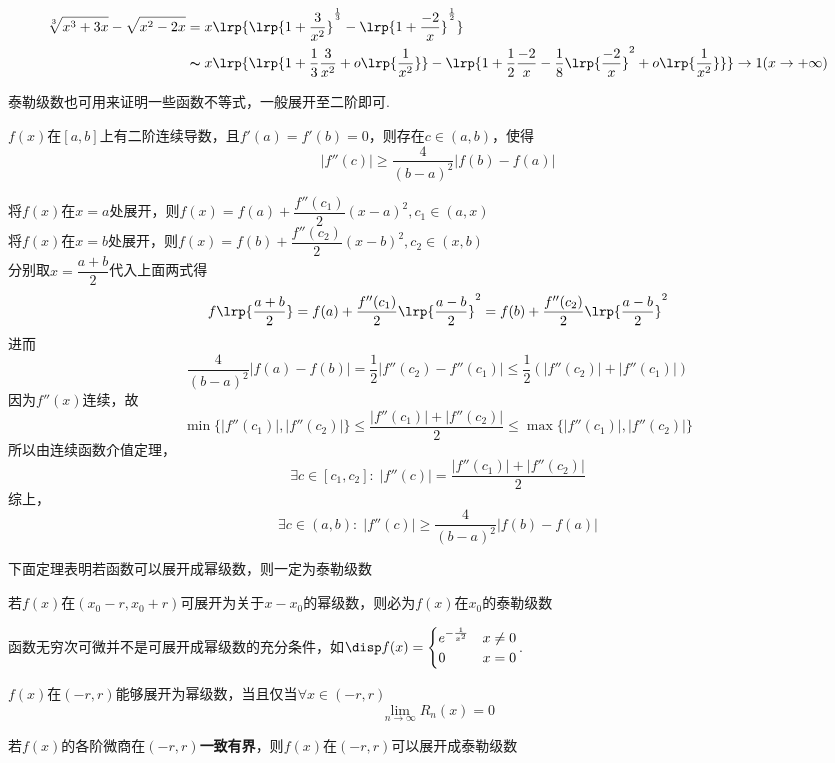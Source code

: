 \begin{analysis}
\[\begin{aligned}
\sqrt[3]{x^3+3x}-\sqrt{x^2-2x}&= x\lrp{\lrp{1+\dfrac{3}{x^2}}^\frac{1}{3}-\lrp{1+\dfrac{-2}{x}}^\frac{1}{2}}\\
&\thicksim x\lrp{\lrp{1+\dfrac{1}{3}\dfrac{3}{x^2}+o\lrp{\dfrac{1}{x^2}}}-\lrp{1+\dfrac{1}{2}\dfrac{-2}{x}-\dfrac{1}{8}\lrp{\dfrac{-2}{x}}^2+o\lrp{\dfrac{1}{x^2}}}}
\to 1(x\to+\infty)
\end{aligned}\]
\end{analysis}
\par 泰勒级数也可用来证明一些函数不等式，一般展开至二阶即可.
\begin{example}
$f(x)$在$[a,b]$上有二阶连续导数，且$f'(a)=f'(b)=0$，则存在$c\in(a,b)$，使得
\[|f''(c)|\geq\dfrac{4}{(b-a)^2}|f(b)-f(a)|\]
\end{example}
\begin{analysis}
将$f(x)$在$x=a$处展开，则$f(x)=f(a)+\dfrac{f''(c_1)}{2}(x-a)^2,c_1\in(a,x)$\\
将$f(x)$在$x=b$处展开，则$f(x)=f(b)+\dfrac{f''(c_2)}{2}(x-b)^2,c_2\in(x,b)$\\
分别取$x=\dfrac{a+b}{2}$代入上面两式得
\[f\lrp{\dfrac{a+b}{2}}=f(a)+\dfrac{f''(c_1)}{2}\lrp{\dfrac{a-b}{2}}^2=f(b)+\dfrac{f''(c_2)}{2}\lrp{\dfrac{a-b}{2}}^2\]
进而
\[\dfrac{4}{(b-a)^2}|f(a)-f(b)|=\dfrac{1}{2}|f''(c_2)-f''(c_1)|\leq\dfrac{1}{2}(|f''(c_2)|+|f''(c_1)|)\]
因为$f''(x)$连续，故
\[\min\{|f''(c_1)|,|f''(c_2)|\}\leq\dfrac{|f''(c_1)|+|f''(c_2)|}{2}\leq\max\{|f''(c_1)|,|f''(c_2)|\}\]
所以由连续函数介值定理，
\[\exists c\in[c_1,c_2]:\;|f''(c)|=\dfrac{|f''(c_1)|+|f''(c_2)|}{2}\]
综上，
\[\exists c\in(a,b):\;|f''(c)|\geq\dfrac{4}{(b-a)^2}|f(b)-f(a)|\]
\end{analysis}
\par 下面定理表明若函数可以展开成幂级数，则一定为泰勒级数
\begin{theorem}[唯一性]
若$f(x)$在$(x_0-r,x_0+r)$可展开为关于$x-x_0$的幂级数，则必为$f(x)$在$x_0$的泰勒级数
\end{theorem}
\par 函数无穷次可微并不是可展开成幂级数的充分条件，如$\disp f(x)=\begin{cases}e^{-\frac{1}{x^2}}&x\ne 0\\0 & x=0\end{cases}$.
\begin{theorem}[充要条件]
$f(x)$在$(-r,r)$能够展开为幂级数，当且仅当$\forall x\in(-r,r)$
\[\lim_{n\to\infty}R_n(x)=0\]
\end{theorem}
\begin{corollary2}[充分条件]
若$f(x)$的各阶微商在$(-r,r)$\textbf{一致有界}，则$f(x)$在$(-r,r)$可以展开成泰勒级数
\end{corollary2}

